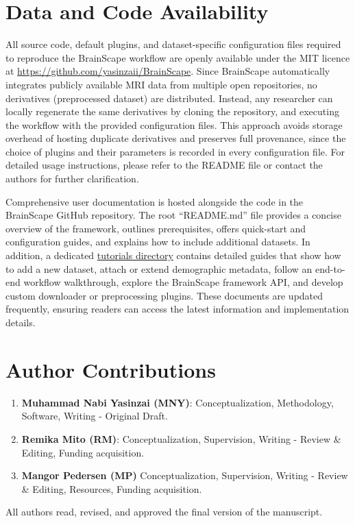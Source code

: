 \section*{Data and Code Availability}

All source code, default plugins, and dataset-specific configuration files required 
to reproduce the BrainScape workflow are openly available under the MIT licence at 
\url{https://github.com/yasinzaii/BrainScape}. Since BrainScape automatically integrates 
publicly available MRI data from multiple open repositories, no derivatives (preprocessed dataset) are distributed. 
Instead, any researcher can locally regenerate the same derivatives by cloning the repository, 
and executing the workflow with the provided configuration files. 
This approach avoids storage overhead of hosting duplicate derivatives 
and preserves full provenance, since the choice of plugins and their parameters is recorded 
in every configuration file. 
For detailed usage instructions, please refer to the README file or contact the authors for further clarification.

Comprehensive user documentation is hosted alongside the code in the BrainScape GitHub repository. 
The root ``README.md'' file provides a concise overview of the framework, outlines prerequisites, 
offers quick-start and configuration guides, and explains how to include additional datasets. 
In addition, a dedicated \href{https://github.com/yasinzaii/BrainScape/tree/main/tutorials}{tutorials directory} 
contains detailed guides that show how to add a new dataset, attach or extend demographic metadata, 
follow an end-to-end workflow walkthrough, explore the BrainScape framework API, 
and develop custom downloader or preprocessing plugins. 
These documents are updated frequently, 
ensuring readers can access the latest information and implementation details.



\section*{Author Contributions}

\begin{enumerate}
    \item \textbf{Muhammad Nabi Yasinzai (MNY)}: Conceptualization, Methodology, Software, Writing - Original Draft.
    \item \textbf{Remika Mito (RM)}: Conceptualization, Supervision, Writing - Review \& Editing, Funding acquisition. 
    \item \textbf{Mangor Pedersen (MP)} Conceptualization, Supervision, Writing - Review \& Editing, Resources, Funding acquisition. 
\end{enumerate}
All authors read, revised, and approved the final version of the manuscript.


